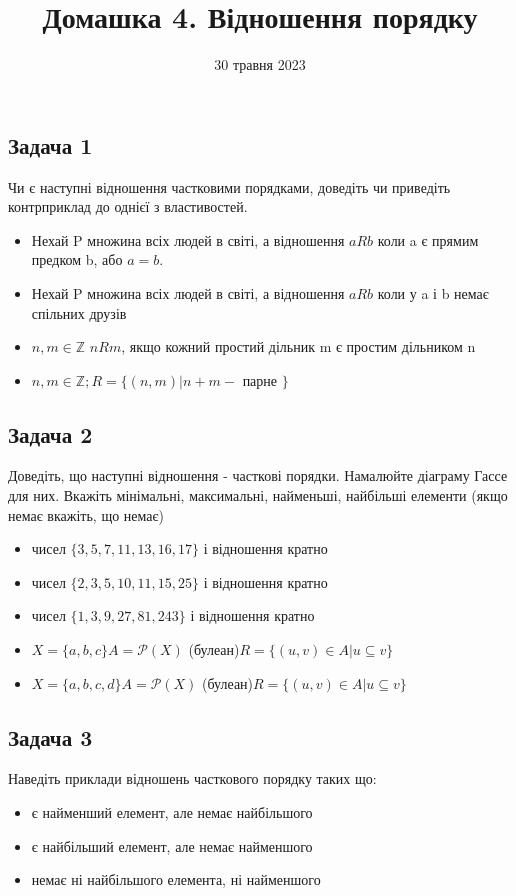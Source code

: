 \documentclass{article}
\begin{document}
\title{Домашка 4. Відношення порядку}
\date{30 травня 2023}

\maketitle

\subsection*{Задача 1}
Чи є наступні відношення частковими порядками, доведіть чи приведіть контрприклад до однієї з властивостей.
\begin{itemize}
    \item Нехай P множина всіх людей в світі, а відношення $aRb$ коли a є прямим предком b, або $a=b$.
    \item Нехай P множина всіх людей в світі, а відношення $aRb$ коли у a і b немає спільних друзів
    \item $n,m \in \mathbb{Z}$ $nRm$, якщо кожний простий дільник m є простим дільником n
    \item $n,m \in \mathbb{Z}; R = \{(n,m)|n+m -$ парне $\}$
\end{itemize}

\subsection*{Задача 2}
Доведіть, що наступні відношення - часткові порядки. Намалюйте діаграму Гассе для них. Вкажіть мінімальні, максимальні, найменьші, найбільші елементи (якщо немає вкажіть, що немає)
\begin{itemize}
    \item чисел $\{3, 5, 7, 11, 13, 16, 17\}$ і відношення кратно
    \item чисел $\{2, 3, 5, 10, 11, 15, 25\}$ і відношення кратно
    \item чисел $\{1, 3, 9, 27, 81, 243\}$ і відношення кратно
    \item $X=\{a,b,c\} A=\mathcal{P}(X)$ (булеан)$  R = \{(u,v) \in A| u \subseteq v\}$
    \item $X=\{a,b,c,d\} A=\mathcal{P}(X)$ (булеан)$  R = \{(u,v) \in A| u \subseteq v\}$
\end{itemize}

\subsection*{Задача 3}
Наведіть приклади відношень часткового порядку таких що:
\begin{itemize}
    \item є найменший елемент, але немає найбільшого
    \item є найбільший елемент, але немає найменшого
    \item немає ні найбільшого елемента, ні найменшого
\end{itemize}
\end{document}
